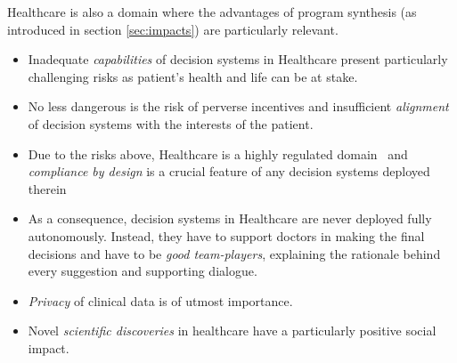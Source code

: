 Healthcare is also a domain where the advantages of program synthesis (as introduced in section \ref{sec:impacts}) are particularly relevant.
\begin{itemize}
    \item Inadequate \emph{capabilities} of decision systems in Healthcare present particularly challenging risks as patient's health and life can be at stake.
    \item No less dangerous is the risk of perverse incentives and insufficient \emph{alignment} of decision systems with the interests of the patient.
    \item Due to the risks above, Healthcare is a highly regulated domain~\cite{asamoahRoleHealthServices2025,barbosaActorsHealthcareRegulation2021,beaussierAccountingFailureRiskbased2016,brennanNewRulesRegulation1996,brownPoliticalEvolutionFederal1992,buschAIRegulationHealthcare2025,changHealthCareRegulation2004,flodgrenExternalInspectionCompliance,kwonSecurityPracticesRegulatory2013,nunesPublicAccountabilitySunshine2011,oikonomouPatientSafetyRegulation2019,oyriHealthcareRegulationResiliencea2021,schaumansEntryRegulationEvidence2008,seddonCloudComputingTransborder2013,sheikhWhatExplainsRegulatory2015,steinkampRegulationHealthcareEthics2007,terryRegulatingHealthcareAI2019} and \emph{compliance by design} is a crucial feature of any decision systems deployed therein
    \item As a consequence, decision systems in Healthcare are never deployed fully autonomously. Instead, they have to support doctors in making the final decisions and have to be \emph{good team-players}, explaining the rationale behind every suggestion and supporting dialogue.
    \item \emph{Privacy} of clinical data is of utmost importance.
    \item Novel \emph{scientific discoveries} in healthcare have a particularly positive social impact.
\end{itemize}

